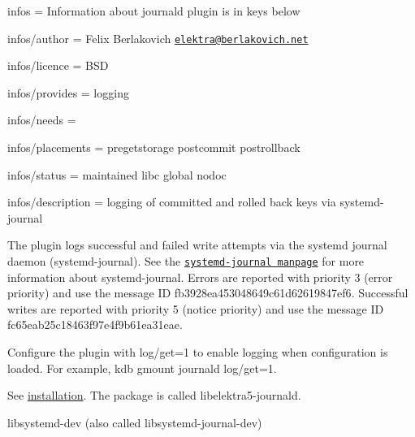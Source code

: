 
\begin{DoxyItemize}
\item infos = Information about journald plugin is in keys below
\item infos/author = Felix Berlakovich \href{mailto:elektra@berlakovich.net}{\tt elektra@berlakovich.\+net}
\item infos/licence = B\+SD
\item infos/provides = logging
\item infos/needs =
\item infos/placements = pregetstorage postcommit postrollback
\item infos/status = maintained libc global nodoc
\item infos/description = logging of committed and rolled back keys via systemd-\/journal
\end{DoxyItemize}

The plugin logs successful and failed write attempts via the systemd journal daemon (systemd-\/journal). See the \href{http://www.freedesktop.org/software/systemd/man/systemd-journald.service.html}{\tt systemd-\/journal manpage} for more information about systemd-\/journal. Errors are reported with priority 3 (error priority) and use the message ID {\ttfamily fb3928ea453048649c61d62619847ef6}. Successful writes are reported with priority 5 (notice priority) and use the message ID {\ttfamily fc65eab25c18463f97e4f9b61ea31eae}.

Configure the plugin with {\ttfamily log/get=1} to enable logging when configuration is loaded. For example, {\ttfamily kdb gmount journald log/get=1}.

See \hyperlink{doc_INSTALL_md}{installation}. The package is called {\ttfamily libelektra5-\/journald}.


\begin{DoxyItemize}
\item {\ttfamily libsystemd-\/dev} (also called {\ttfamily libsystemd-\/journal-\/dev}) 
\end{DoxyItemize}